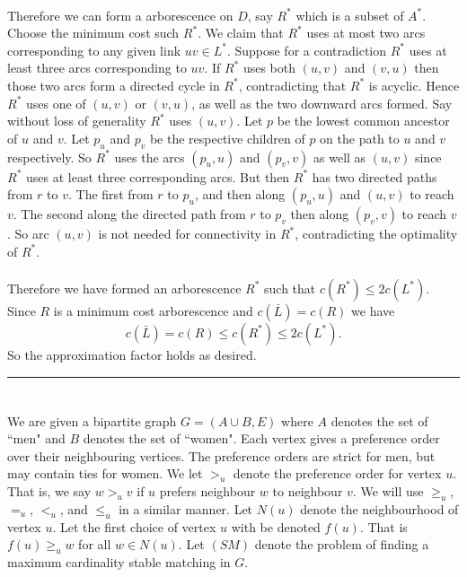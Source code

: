 \documentclass[letterpaper,12pt,oneside,onecolumn]{article}
\newenvironment{proof}{{\bf Proof:  }}{\hfill\rule{2mm}{2mm}}
\begin{document}
\begin{proof}
\paragraph{}
Therefore we can form a arborescence on $D$, say $R^*$ which is a subset of $A^*$. Choose the minimum cost such $R^*$. We claim that $R^*$ uses at most two arcs corresponding to any given link $uv \in L^*$. Suppose for a contradiction $R^*$ uses at least three arcs corresponding to $uv$. If $R^*$ uses both $(u,v)$ and $(v,u)$ then those two arcs form a directed cycle in $R^*$, contradicting that $R^*$ is acyclic. Hence $R^*$ uses one of $(u,v)$ or $(v,u)$, as well as the two downward arcs formed. Say without loss of generality $R^*$ uses $(u,v)$. Let $p$ be the lowest common ancestor of $u$ and $v$. Let $p_u$ and $p_v$ be the respective children of $p$ on the path to $u$ and $v$ respectively. So $R^*$ uses the arcs $(p_u,u)$ and $(p_v,v)$ as well as $(u,v)$ since $R^*$ uses at least three corresponding arcs. But then $R^*$ has two directed paths from $r$ to $v$. The first from $r$ to $p_u$, and then along $(p_u,u)$ and $(u,v)$ to reach $v$. The second along the directed path from $r$ to $p_v$ then along $(p_v, v)$ to reach $v$. So arc $(u,v)$ is not needed for connectivity in $R^*$, contradicting the optimality of $R^*$.
\paragraph{}
Therefore we have formed an arborescence $R^*$ such that $c(R^*) \leq 2c(L^*)$. Since $R$ is a minimum cost arborescence and $c(\bar{L}) = c(R)$ we have
$$c(\bar{L}) = c(R) \leq c(R^*) \leq 2c(L^*).$$
So the approximation factor holds as desired.
\end{proof}
\section{}
\paragraph{}
We are given a bipartite graph $G=(A\cup B, E)$ where $A$ denotes the set of ``men" and $B$ denotes the set of ``women". Each vertex gives a preference order over their neighbouring vertices. The preference orders are strict for men, but may contain ties for women. We let $>_u$ denote the preference order for vertex $u$. That is, we say $w >_u v $ if $u$ prefers neighbour $w$ to neighbour $v$. We will use $\geq_u$, $=_u$, $<_u$, and $\leq_u$ in a similar manner. Let $N(u)$ denote the neighbourhood of vertex $u$. Let the first choice of vertex $u$ with be denoted $f(u)$. That is $f(u) \geq_u w$ for all $w \in N(u)$. Let $(SM)$ denote the problem of finding a maximum cardinality stable matching in $G$.
\end{document}
